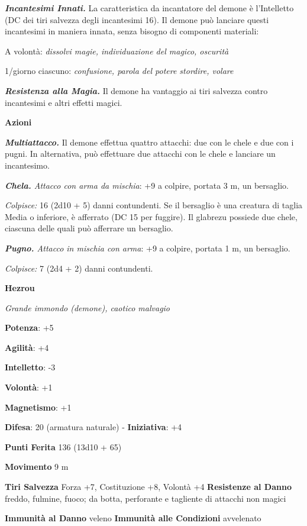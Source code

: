 \begin{multicols}{2}
\emph{\textbf{Incantesimi Innati.}} La caratteristica da incantatore del
demone è l'Intelletto (DC dei tiri salvezza degli incantesimi 16). Il
demone può lanciare questi incantesimi in maniera innata, senza bisogno
di componenti materiali:

A volontà: \emph{dissolvi magie, individuazione del magico, oscurità}

1/giorno ciascuno: \emph{confusione, parola del potere stordire, volare}

\emph{\textbf{Resistenza alla Magia.}} Il demone ha vantaggio ai tiri
salvezza contro incantesimi e altri effetti magici.

\smallskip\textbf{Azioni}

\emph{\textbf{Multiattacco.}} Il demone effettua quattro attacchi: due
con le chele e due con i pugni. In alternativa, può effettuare due
attacchi con le chele e lanciare un incantesimo.

\emph{\textbf{Chela.} Attacco con arma da mischia}: +9 a colpire,
portata 3 m, un bersaglio.

\emph{Colpisce:} 16 (2d10 + 5) danni contundenti. Se il bersaglio è una
creatura di taglia Media o inferiore, è afferrato (DC 15 per fuggire).
Il glabrezu possiede due chele, ciascuna delle quali può afferrare un
bersaglio.

\emph{\textbf{Pugno.} Attacco in mischia con arma}: +9 a colpire,
portata 1 m, un bersaglio.

\emph{Colpisce:} 7 (2d4 + 2) danni contundenti.

\textbf{Hezrou}

\emph{Grande immondo (demone), caotico malvagio}

\textbf{Potenza}: +5

\textbf{Agilità}: +4

\textbf{Intelletto}: -3

\textbf{Volontà}: +1

\textbf{Magnetismo}: +1

\textbf{Difesa}: 20 (armatura naturale) - \textbf{Iniziativa}: +4

\textbf{Punti Ferita} 136 (13d10 + 65)

\textbf{Movimento} 9 m

\textbf{Tiri Salvezza} Forza +7, Costituzione +8, Volontà +4
\textbf{Resistenze al Danno} freddo, fulmine, fuoco; da botta,
perforante e tagliente di attacchi non magici

\textbf{Immunità al Danno} veleno \textbf{Immunità alle Condizioni}
avvelenato


\end{multicols}
